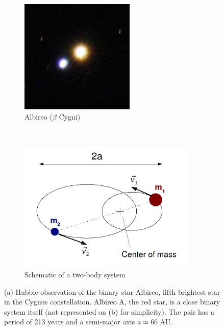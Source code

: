 \begin{figure}
\center
    \centering
    \begin{subfigure}[b]{0.48\textwidth}
    	\centering
        \includegraphics[width=0.6\textwidth]{Figures/0_albireo.jpg}
        \caption{Albireo ($\beta$ Cygni)}
        \label{Fig:0_binary_1}
    \end{subfigure}
    ~~
    \begin{subfigure}[b]{0.48\textwidth}
    	\centering
        \includegraphics[width=0.93\textwidth]{Figures/0_elliptictrajectories.png}
        \caption{Schematic of a two-body system}
        \label{Fig:0_binary_2}
    \end{subfigure}
\caption{(a) Hubble observation of the binary star Albireo, fifth brightest star in the Cygnus constellation. Albireo A, the red star, is a close binary system itself (not represented on (b) for simplicity). The pair has a period of 213 years and a semi-major axis $a \simeq 66$ AU. }
\label{Fig:0_binary}
\end{figure}





